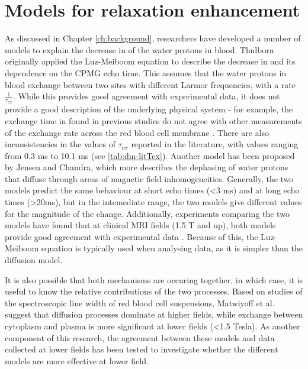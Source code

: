\chapter{Models for \Ttwo relaxation enhancement}\label{ch:models}

As discussed in Chapter \ref{ch:background}, researchers have developed a number of models to explain the decrease in \Ttwo of the water protons in blood.
Thulborn originally applied the Luz-Meiboom equation to describe the decrease in \Ttwo and its dependence on the CPMG echo time\cite{ThulbornOxygenationdependencetransverse1982}.
This assumes that the water protons in blood exchange between two sites with different Larmor frequencies, with a rate $\frac{1}{\tau_{ex}}$.
While this provides good agreement with experimental data, it does not provide a good description of the underlying physical system - for example, the exchange time in found in previous studies do not agree with other measurements of the exchange rate across the red blood cell membrane \cite{Herbstreviewwaterdiffusion1989}.
There are also inconsistencies in the values of $\tau_{ex}$ reported in the literature, with values ranging from 0.3 ms to 10.1 ms (see \autoref{tab:dm-litTex}).
Another model has been proposed by Jensen and Chandra, which more describes the dephasing of water protons that diffuse through areas of magnetic field inhomogeneities\cite{JensenNMRrelaxationtissues2000}.
Generally, the two models predict the same behaviour at short echo times (\textless 3 ms) and at long echo times (\textgreater 20ms)\cite{BrooksT2shorteningweaklymagnetized2001}, but in the intemediate range, the two models give different values for the magnitude of the \Ttwo change.
Additionally, experiments comparing the two models have found that at clinical MRI fields (1.5 T and up), both models provide good agreement with experimental data \cite{StefanovicHumanwholebloodrelaxometry2004,ChenHumanwholeblood2009,GardenerDependencebloodR22010,GrgacHematocritoxygenationdependence2013}.
Because of this, the Luz-Meiboom equation is typically used when analysing data, as it is simpler than the diffusion model.

It is also possible that both mechanisms are occuring together, in which case, it is useful to know the relative contributions of the two processes.
Based on studies of the spectroscopic line width of red blood cell suspensions, Matwiyoff et al. suggest that diffusion processes dominate at higher fields, while exchange between cytoplasm and plasma is more significant at lower fields (\textless 1.5 Tesla)\cite{Matwiyofflineshapeswater1990}.
As another component of this research, the agreement between these models and data collected at lower fields has been tested to investigate whether the different models are more effective at lower field.

